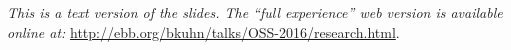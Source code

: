 \begin{center}
\textit{
This is a text version of the slides. The ``full experience'' web version is available
online at:} \url{http://ebb.org/bkuhn/talks/OSS-2016/research.html}.

\end{center}
